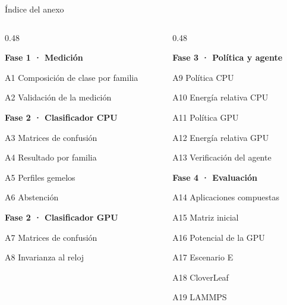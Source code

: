 \begin{frame}{Índice del anexo}
  \vspace{2mm}
  \footnotesize
  \begin{columns}[T]
    \begin{column}{0.48\textwidth}
      \begin{card}
        \textbf{Fase 1 · Medición}\par
        A1 Composición de clase por familia\par
        A2 Validación de la medición
      \end{card}
      \begin{card}
        \textbf{Fase 2 · Clasificador CPU}\par
        A3 Matrices de confusión\par
        A4 Resultado por familia\par
        A5 Perfiles gemelos\par
        A6 Abstención
      \end{card}
      \begin{card}
        \textbf{Fase 2 · Clasificador GPU}\par
        A7 Matrices de confusión\par
        A8 Invarianza al reloj
      \end{card}
    \end{column}
    \begin{column}{0.48\textwidth}
      \begin{card}
        \textbf{Fase 3 · Política y agente}\par
        A9 Política CPU\par
        A10 Energía relativa CPU\par
        A11 Política GPU\par
        A12 Energía relativa GPU\par
        A13 Verificación del agente
      \end{card}
      \begin{card}
        \textbf{Fase 4 · Evaluación}\par
        A14 Aplicaciones compuestas\par
        A15 Matriz inicial\par
        A16 Potencial de la GPU\par
        A17 Escenario E\par
        A18 CloverLeaf\par
        A19 LAMMPS
      \end{card}
    \end{column}
  \end{columns}
\end{frame}

